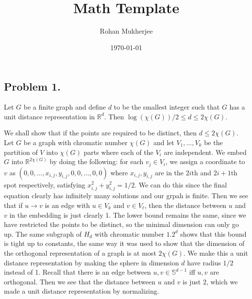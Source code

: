 \documentclass[12pt]{article}
\title{Math Template}
\date{\today}
\author{Rohan Mukherjee}
\newenvironment{theorem}{\begin{mytheorem}}{\end{mytheorem}}
\theoremstyle{definitionstyle}
\def\mbb#1{\mathbb{#1}}
\def\R{\mbb{R}}
\renewcommand{\S}{\mbb S}
\begin{document}
    \maketitle
    \subsection*{Problem 1.}
    \begin{theorem}
        Let $G$ be a finite graph and define $d$ to be the smallest integer such that $G$ has a unit distance representation in $\R^d$. Then $\log(\chi(G))/2 \leq d \leq 2\chi(G)$. 
    \end{theorem}
    We shall show that if the points are required to be distinct, then $d \leq 2\chi(G)$. Let $G$ be a graph with chromatic number $\chi(G)$ and let $V_1, \ldots, V_k$ be the partition of $V$ into $\chi(G)$ parts where each of the $V_i$ are independent. We embed $G$ into $\R^{2\chi(G)}$ by doing the following: for each $v_j \in V_i$, we assign a coordinate to $v$ as $(0, 0, \ldots, x_{i,j}, y_{i,j}, 0, 0, \ldots, 0, 0)$ where $x_{i,j}, y_{i,j}$ are in the $2i$th and $2i+1$th spot respectively, satisfying $x_{i,j}^2 + y_{i,j}^2 = 1/2$. We can do this since the final equation clearly has infinitely many solutions and our grpah is finite. Then we see that if $u \to v$ is an edge with $u \in V_k$ and $v \in V_\ell$, then the distance between $u$ and $v$ in the embedding is just clearly 1. The lower bound remains the same, since we have restricted the points to be distinct, so the minimal dimension can only go up. The same subgraph of $H_d$ with chromatic number $1.2^d$ shows that this bound is tight up to constants, the same way it was used to show that the dimension of the orthogonal representation of a graph is at most $2\chi(G)$. We make this a unit distance representation by making the sphere in dimension $d$ have radius $1/2$ instead of 1. Recall that there is an edge between $u, v \in \S^{d-1}$ iff $u,v$ are orthogonal. Then we see that the distance between $u$ and $v$ is just $2$, which we made a unit distance representation by normalizing.
    
\end{document}
